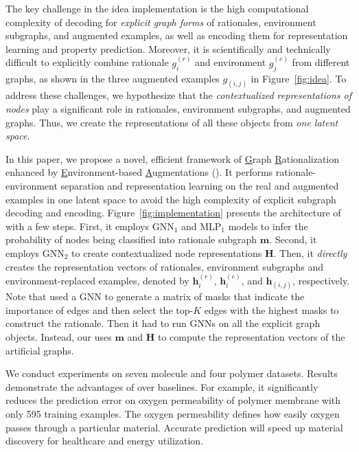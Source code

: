 \documentclass[sigconf]{acmart}
\begin{document}
The key challenge in the idea implementation is the high computational complexity of decoding for \emph{explicit graph forms} of rationales, environment subgraphs, and augmented examples, as well as encoding them for representation learning and property prediction.
Moreover, it is scientifically and technically difficult to explicitly combine rationale $g^{(r)}_i$ and environment $g^{(e)}_j$ from different graphs, as shown in the three augmented examples $g_{(i,j)}$ in Figure~\ref{fig:idea}. To address these challenges, we hypothesize that the \emph{contextualized representations of nodes} play a significant role in rationales, environment subgraphs, and augmented graphs. 
Thus, we create the representations of all these objects from \emph{one latent space}.

In this paper, we propose a novel, efficient framework of \underline{G}raph \underline{R}ationalization enhanced by \underline{E}nvironment-based \underline{A}ugmentations (\method).
It performs rationale-environment separation and representation learning on the real and augmented examples in  one latent space to avoid the high complexity of explicit subgraph decoding and encoding.
Figure~\ref{fig:implementation} presents the architecture of \method with a few steps.
First, it employs $\text{GNN}_1$ and $\text{MLP}_1$ models to infer the probability of nodes being classified into rationale subgraph $\mathbf{m}$.
Second, it employs $\text{GNN}_2$ to create contextualized node representations $\mathbf{H}$.
Then, it \emph{directly} creates the representation vectors of rationales, environment subgraphs and environment-replaced examples, denoted by $\mathbf{h}^{(r)}_i$, $\mathbf{h}^{(e)}_i$, and $\mathbf{h}_{(i,j)}$, respectively. Note that \dir \cite{wu2022discovering} used a GNN to generate a matrix of masks that indicate the importance of edges and then select the top-$K$ edges with the highest masks to construct the rationale. Then it had to run GNNs on all the explicit graph objects.
Instead, our \method uses $\mathbf{m}$ and $\mathbf{H}$ to compute the representation vectors of the artificial graphs.

We conduct experiments on seven molecule and four polymer datasets. Results demonstrate the advantages of \method over baselines. For example, it significantly reduces the prediction error on oxygen permeability of polymer membrane with only 595 training examples. The oxygen permeability defines how easily oxygen passes through a particular material. Accurate prediction will speed up material discovery for healthcare and energy utilization.
\end{document}

